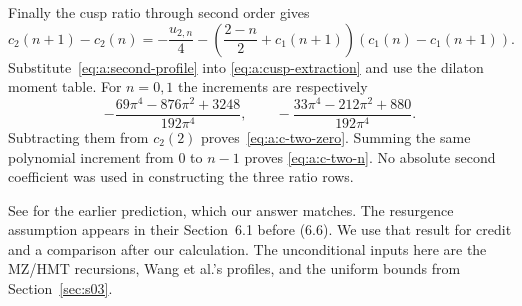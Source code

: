 \begin{prf}
Finally the cusp ratio through second order gives
\[
 c_2(n+1)-c_2(n)=-\frac{u_{2,n}}4
 -\left(\frac{2-n}{2}+c_1(n+1)\right)
                         (c_1(n)-c_1(n+1)).
\]
Substitute~\eqref{eq:a:second-profile} into
\eqref{eq:a:cusp-extraction} and use the dilaton moment table.
For $n=0,1$ the increments are respectively
\[
 -\frac{69\pi^4-876\pi^2+3248}{192\pi^4},\qquad
 -\frac{33\pi^4-212\pi^2+880}{192\pi^4}.
\]
Subtracting them from $c_2(2)$ proves~\eqref{eq:a:c-two-zero}.
Summing the same polynomial increment from $0$ to $n-1$ proves
\eqref{eq:a:c-two-n}. No absolute second coefficient was used in
constructing the three ratio rows.
\end{prf}

\begin{rmk}[Prediction]
See \cite[(6.10)]{EGGLS24} for the earlier prediction, which our answer
matches.
The resurgence assumption appears in their Section~6.1 before (6.6).
We use that result for credit and a comparison after our calculation.
The unconditional inputs here
are the MZ/HMT recursions, Wang et al.'s profiles, and the uniform bounds from
Section~\ref{sec:s03}.
\end{rmk}
